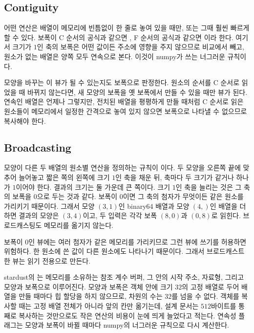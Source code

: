 \subsection{Contiguity}

어떤 연산은 배열이 메모리에 빈틈없이 한 줄로 놓여 있을 때만, 또는 그때 훨씬 빠르게 할 수 있다. 보폭이 C 순서의 공식과 같으면 , F 순서의 공식과 같으면 이라 한다. 여기서 크기가 $1$인 축의 보폭은 어떤 값이든 주소에 영향을 주지 않으므로 비교에서 빼고, 원소가 없는 배열은 양쪽 모두 연속으로 본다. 이것이 numpy가 쓰는 너그러운 규칙이다.

모양을 바꾸는 이 뷰가 될 수 있는지도 보폭으로 판정한다. 원소의 순서를 C 순서로 읽었을 때 바뀌지 않는다면, 새 모양의 보폭을 옛 보폭에서 만들 수 있을 때만 뷰가 된다. 연속인 배열은 언제나 그렇지만, 전치된 배열을 평평하게 만들 때처럼 C 순서로 읽은 원소들이 메모리에서 일정한 간격으로 놓여 있지 않으면 보폭으로 나타낼 수 없으므로 복사해야 한다.

\subsection{Broadcasting}

모양이 다른 두 배열의 원소별 연산을 정의하는 규칙이 이다. 두 모양을 오른쪽 끝에 맞추어 늘어놓고 짧은 쪽의 왼쪽에 크기 $1$인 축을 채운 뒤, 축마다 두 크기가 같거나 하나가 $1$이어야 한다. 결과의 크기는 둘 가운데 큰 쪽이다. 크기 $1$인 축을 늘리는 것은 그 축의 보폭을 $0$으로 두는 것과 같다. 보폭이 $0$이면 그 축의 첨자가 무엇이든 같은 원소를 가리키기 때문이다. 그래서 모양 $(3,1)$인 binary64 배열과 모양 $(4,)$인 배열을 더하면 결과의 모양은 $(3,4)$이고, 두 입력은 각각 보폭 $(8,0)$과 $(0,8)$로 읽힌다. 브로드캐스팅도 메모리를 옮기지 않는다.

보폭이 $0$인 뷰에는 여러 첨자가 같은 메모리를 가리키므로 그런 뷰에 쓰기를 허용하면 위험하다. 한 원소에 쓴 값이 다른 원소에도 나타나기 때문이다. 그래서 브로드캐스트한 뷰는 읽기 전용으로 만든다.

\begin{instardust}
stardust의 는 메모리를 소유하는 참조 계수 버퍼, 그 안의 시작 주소, 자료형, 그리고 모양과 보폭으로 이루어진다. 모양과 보폭은 객체 안에 크기 $32$의 고정 배열로 두어 배열을 만들 때마다 힙 할당을 하지 않으므로, 차원의 수는 $32$를 넘을 수 없다. 객체를 복사할 때는 고정 배열 전체가 아니라 앞의 칸만 옮기는데, 설계 문서는 $512$바이트를 통째로 복사하는 것만으로도 작은 연산의 비용이 눈에 띄게 늘었다고 적는다. 연속성 플래그는 모양과 보폭이 바뀔 때마다 numpy의 너그러운 규칙으로 다시 계산한다.
\end{instardust}

